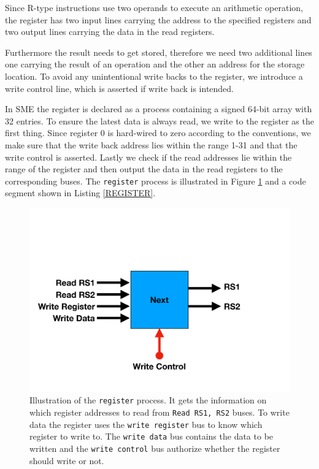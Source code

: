         Since R-type instructions use two operands to execute an arithmetic operation, the register has two input lines carrying the address to the specified registers and two output lines carrying the data in the read registers.
        
        Furthermore the result needs to get stored, therefore we need two additional lines one carrying the result of an operation and the other an address for the storage location. To avoid any unintentional write backs to the register, we introduce a write control line, which is asserted if write back is intended.
        
        In SME the register is declared as a process containing a signed 64-bit array with 32 entries. To ensure the latest data is always read, we write to the register as the first thing. Since register 0 is hard-wired to zero according to the conventions, we make sure that the write back address lies within the range 1-31 and that the write control is asserted.
        Lastly we check if the read addresses lie within the range of the register and then output the data in the read registers to the corresponding buses. The \texttt{register} process is illustrated in Figure \ref{fig:REGISTER} and a code segment shown in Listing \ref{REGISTER}.
    
        \begin{figure}[h!]
            \centering
            \includegraphics[scale=0.29]{pictures/REGISTER.pdf}
            \caption{Illustration of the \texttt{register} process. It gets the information on which register addresses to read from \texttt{Read RS1, RS2} buses. To write data the register uses the \texttt{write register} bus to know which register to write to. The \texttt{write data} bus contains the data to be written and the \texttt{write control} bus authorize whether the register should write or not.}
            \label{fig:REGISTER}
        \end{figure}
    
